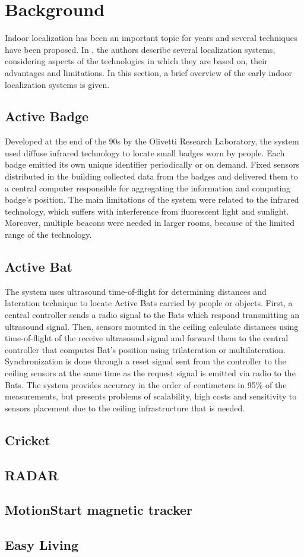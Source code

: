 \section{Background}

Indoor localization has been an important topic for years and several techniques have been proposed. In \cite{locSysUbiComp}, the authors describe several localization systems, considering aspects of the technologies in which they are based on, their advantages and limitations. In this section, a brief overview of the early indoor localization systems is given.

\subsection{Active Badge}
Developed at the end of the 90s by the Olivetti Research Laboratory, the system used diffuse infrared technology to locate small badges worn by people. Each badge emitted its own unique identifier periodically or on demand. Fixed sensors distributed in the building collected data from the badges and delivered them to a central computer responsible for aggregating the information and computing badge's position. The main limitations of the system were related to the infrared technology, which suffers with interference from fluorescent light and sunlight. Moreover, multiple beacons were needed in larger rooms, because of the limited range of the technology.

\subsection{Active Bat}
The system uses ultrasound time-of-flight for determining distances and lateration technique to locate Active Bats carried by people or objects. First, a central controller sends a radio signal to the Bats which respond transmitting an ultrasound signal. Then, sensors mounted in the ceiling calculate distances using time-of-flight of the receive ultrasound signal and forward them to the central controller that computes Bat's position using trilateration or multilateration. Synchronization is done through a reset signal sent from the controller to the ceiling sensors at the same time as the request signal is emitted via radio to the Bats. The system provides accuracy in the order of centimeters in 95\% of the measurements, but presents problems of scalability, high costs and sensitivity to sensors placement due to the ceiling infrastructure that is needed.

\subsection{Cricket}

\subsection{RADAR}

\subsection{MotionStart magnetic tracker}

\subsection{Easy Living}
